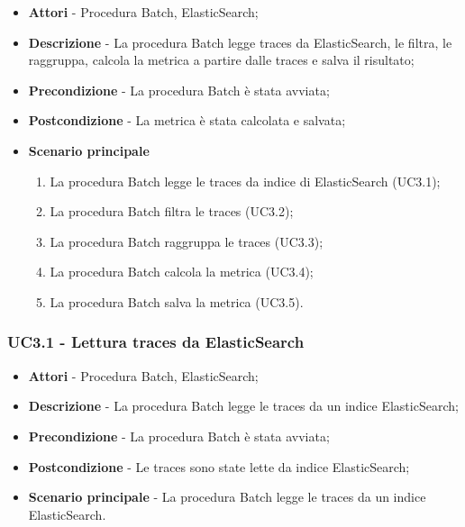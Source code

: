             \begin{itemize}

                \item \textbf{Attori} - Procedura Batch, ElasticSearch;
                \item \textbf{Descrizione} - La procedura Batch legge traces da ElasticSearch, le filtra, le raggruppa,
                calcola la metrica a partire dalle traces e salva il risultato;
                \item \textbf{Precondizione} - La procedura Batch è stata avviata;
                \item \textbf{Postcondizione} - La metrica è stata calcolata e salvata;
                \item \textbf{Scenario principale}

                    \begin{enumerate}

                        \item La procedura Batch legge le traces da indice di ElasticSearch (UC3.1);
                        \item La procedura Batch filtra le traces (UC3.2);
                        \item La procedura Batch raggruppa le traces (UC3.3);
                        \item La procedura Batch calcola la metrica (UC3.4);
                        \item La procedura Batch salva la metrica (UC3.5).

                    \end{enumerate}

            \end{itemize}

                \subsubsection{UC3.1 - Lettura traces da ElasticSearch}

                    \begin{itemize}

                        \item \textbf{Attori} - Procedura Batch, ElasticSearch;
                        \item \textbf{Descrizione} - La procedura Batch legge le traces da un indice ElasticSearch;
                        \item \textbf{Precondizione} - La procedura Batch è stata avviata;
                        \item \textbf{Postcondizione} - Le traces sono state lette da indice ElasticSearch;
                        \item \textbf{Scenario principale} - La procedura Batch legge le traces da un indice ElasticSearch.

                    \end{itemize}
                
